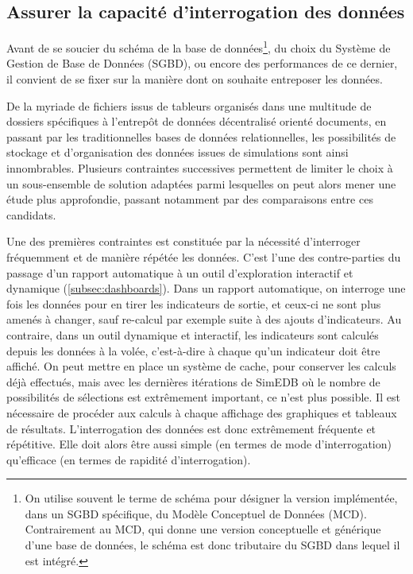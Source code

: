 \subsection{Assurer la capacité d'interrogation des données}\label{subsec:capacite-interrogation}

Avant de se soucier du \og schéma\fg{} de la base de données\footnote{
	On utilise souvent le terme de \og schéma\fg{} pour désigner la version implémentée, dans un SGBD spécifique, du Modèle Conceptuel de Données (MCD).
	Contrairement au MCD, qui donne une version conceptuelle et générique d'une base de données, le schéma est donc tributaire du SGBD dans lequel il est intégré.
}, du choix du Système de Gestion de Base de Données (SGBD), ou encore des performances de ce dernier, il convient de se fixer sur la manière dont on souhaite entreposer les données.

De la myriade de fichiers issus de tableurs organisés dans une multitude de dossiers spécifiques à l'entrepôt de données décentralisé orienté documents, en passant par les traditionnelles bases de données relationnelles, les possibilités de stockage et d'organisation des données issues de simulations sont ainsi innombrables.
Plusieurs contraintes successives permettent de limiter le choix à un sous-ensemble de solution adaptées parmi lesquelles on peut alors mener une étude plus approfondie, passant notamment par des comparaisons entre ces candidats.

Une des premières contraintes est constituée par la nécessité d'interroger fréquemment et de manière répétée les données.
C'est l'une des contre-parties du passage d'un rapport automatique à un outil d'exploration interactif et dynamique (\cref{subsec:dashboards}).
Dans un rapport automatique, on interroge une fois les données pour en tirer les indicateurs de sortie, et ceux-ci ne sont plus amenés à changer, sauf re-calcul par exemple suite à des ajouts d'indicateurs.
Au contraire, dans un outil dynamique et interactif, les indicateurs sont calculés depuis les données \og à la volée\fg{}, c'est-à-dire à chaque qu'un indicateur doit être affiché.
On peut mettre en place un système de cache, pour conserver les calculs déjà effectués, mais avec les dernières itérations de SimEDB où le nombre de possibilités de sélections est extrêmement important, ce n'est plus possible.
Il est nécessaire de procéder aux calculs à chaque affichage des graphiques et tableaux de résultats.
L'interrogation des données est donc extrêmement fréquente et répétitive.
Elle doit alors être aussi simple (en termes de mode d'interrogation) qu'efficace (en termes de rapidité d'interrogation).

